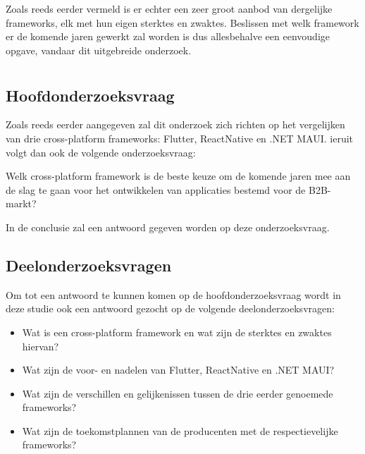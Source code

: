 Zoals reeds eerder vermeld is er echter een zeer groot aanbod van dergelijke frameworks, elk met hun eigen sterktes en zwaktes. Beslissen met welk framework er de komende jaren gewerkt zal worden is dus allesbehalve een eenvoudige opgave, vandaar dit uitgebreide onderzoek.

\section{}
\label{sec:onderzoeksvraag}


\subsection{Hoofdonderzoeksvraag}

Zoals reeds eerder aangegeven zal dit onderzoek zich richten op het vergelijken van drie cross-platform frameworks: Flutter, ReactNative en .NET MAUI. ieruit volgt dan ook de volgende onderzoeksvraag:

Welk cross-platform framework is de beste keuze om de komende jaren mee aan de slag te gaan voor het ontwikkelen van applicaties bestemd voor de B2B-markt?

In de conclusie zal een antwoord gegeven worden op deze onderzoeksvraag.

\subsection{Deelonderzoeksvragen}

Om tot een antwoord te kunnen komen op de hoofdonderzoeksvraag wordt in deze studie ook een antwoord gezocht op de volgende deelonderzoeksvragen:

\begin{itemize}
    \item Wat is een cross-platform framework en wat zijn de sterktes en zwaktes hiervan?
    \item Wat zijn de voor- en nadelen van Flutter, ReactNative en .NET MAUI?
    \item Wat zijn de verschillen en gelijkenissen tussen de drie eerder genoemede frameworks?
    \item Wat zijn de toekomstplannen van de producenten met de respectievelijke frameworks?
\end{itemize}

